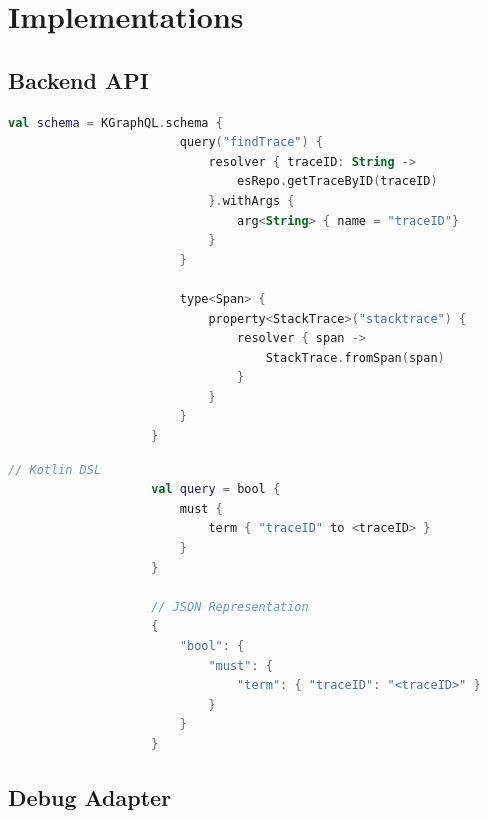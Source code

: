 \documentclass[12pt,pdftex,titlepage]{report}
\begin{document}
        \newpage          
        \section{Implementations}    
            \subsection{Backend API}
                \begin{lstlisting}[caption=Kotlin snippet of defining the GraphQL schema using the Kotlin DSL., language=Kotlin, gobble=20]
                    val schema = KGraphQL.schema { 
                        query("findTrace") { 
                            resolver { traceID: String ->
                                esRepo.getTraceByID(traceID)
                            }.withArgs { 
                                arg<String> { name = "traceID"}
                            }
                        }

                        type<Span> {
                            property<StackTrace>("stacktrace") { 
                                resolver { span ->
                                    StackTrace.fromSpan(span)
                                }
                            }
                        }
                    }                
                \end{lstlisting}

                \begin{lstlisting}[caption={Comparison between Elasticsearch query using Kotlin DSL and the query in its JSON representation, where $\langle$traceID$\rangle$ refers
                    to a variable storing the trace identifier.}, language=Kotlin, gobble=20]
                    // Kotlin DSL
                    val query = bool {
                        must {
                            term { "traceID" to <traceID> }
                        }
                    }

                    // JSON Representation
                    {
                        "bool": {
                            "must": {
                                "term": { "traceID": "<traceID>" }
                            }
                        }
                    }
                \end{lstlisting}
            \subsection{Debug Adapter}
            
\end{document}

